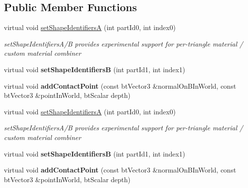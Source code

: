 \subsection*{Public Member Functions}
\begin{DoxyCompactItemize}
\item 
\mbox{\label{structbtPointCollector_ac29e8e1a123f46faf555910bd9bc41b6}} 
virtual void \hyperlink{structbtPointCollector_ac29e8e1a123f46faf555910bd9bc41b6}{set\+Shape\+IdentifiersA} (int part\+Id0, int index0)
\begin{DoxyCompactList}\small\item\em set\+Shape\+Identifiers\+A/B provides experimental support for per-\/triangle material / custom material combiner \end{DoxyCompactList}\item 
\mbox{\label{structbtPointCollector_a0cdf57ed98596e4cad8385a13fff12ea}} 
virtual void {\bfseries set\+Shape\+IdentifiersB} (int part\+Id1, int index1)
\item 
\mbox{\label{structbtPointCollector_afaf449bb17d0d62afe2a7f8f54318c3b}} 
virtual void {\bfseries add\+Contact\+Point} (const bt\+Vector3 \&normal\+On\+B\+In\+World, const bt\+Vector3 \&point\+In\+World, bt\+Scalar depth)
\item 
\mbox{\label{structbtPointCollector_ac29e8e1a123f46faf555910bd9bc41b6}} 
virtual void \hyperlink{structbtPointCollector_ac29e8e1a123f46faf555910bd9bc41b6}{set\+Shape\+IdentifiersA} (int part\+Id0, int index0)
\begin{DoxyCompactList}\small\item\em set\+Shape\+Identifiers\+A/B provides experimental support for per-\/triangle material / custom material combiner \end{DoxyCompactList}\item 
\mbox{\label{structbtPointCollector_a0cdf57ed98596e4cad8385a13fff12ea}} 
virtual void {\bfseries set\+Shape\+IdentifiersB} (int part\+Id1, int index1)
\item 
\mbox{\label{structbtPointCollector_afaf449bb17d0d62afe2a7f8f54318c3b}} 
virtual void {\bfseries add\+Contact\+Point} (const bt\+Vector3 \&normal\+On\+B\+In\+World, const bt\+Vector3 \&point\+In\+World, bt\+Scalar depth)
\end{DoxyCompactItemize}
